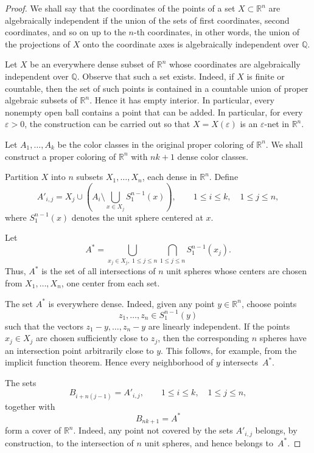 \documentclass[12pt,a4paper]{article}
\begin{document}
\begin{proof}
We shall say that the coordinates of the points of a set
$X\subset\mathbb{R}^n$ are algebraically independent if the union of the
sets of first coordinates, second coordinates, and so on up to the
$n$-th coordinates, in other words, the union of the projections of $X$ onto
the coordinate axes is algebraically independent over $\mathbb{Q}$.

Let $X$ be an everywhere dense subset of $\mathbb{R}^n$ whose coordinates
are algebraically independent over $\mathbb{Q}$. Observe that such a set exists. Indeed, if $X$ is finite
or countable, then the set of such points is contained in a countable union
of proper algebraic subsets of \(\mathbb R^n\). Hence it has empty
interior. In particular, every nonempty open ball contains a point that
can be added.  In particular, for every $\varepsilon>0$,
the construction can be carried out so that $X=X(\varepsilon)$ is an
$\varepsilon$-net in $\mathbb{R}^n$.

Let $A_1,\dots,A_k$ be the color classes in the original proper coloring
of $\mathbb{R}^n$. We shall construct a proper coloring of $\mathbb{R}^n$
with $nk+1$ dense color classes.

Partition $X$ into $n$ subsets
$X_1,\dots,X_n$, each dense in $\mathbb{R}^n$. Define
\[
    A'_{i,j}
    =
    X_j\cup
    \left(
        A_i\setminus
        \bigcup_{x\in X_j}S^{n-1}_1(x)
    \right),
    \qquad
    1\leq i\leq k,\quad 1\leq j\leq n,
\]
where $S^{n-1}_1(x)$ denotes the unit sphere centered at $x$.

Let
\[
    A^*
    =
    \bigcup_{x_j\in X_j,\;1\leq j\leq n}
    \bigcap_{1\leq j\leq n} S^{n-1}_1(x_j).
\]
Thus, $A^*$ is the set of all intersections of $n$ unit spheres whose
centers are chosen from $X_1,\dots,X_n$, one center from each set.

The set $A^*$ is everywhere dense. Indeed, given any point
$y\in\mathbb{R}^n$, choose points
\[
z_1,\dots,z_n\in S^{n-1}_1(y)
\]
such that the vectors $z_1-y,\dots,z_n-y$ are linearly independent.
If the points $x_j\in X_j$ are chosen sufficiently close to $z_j$, then
the corresponding $n$ spheres have an intersection point arbitrarily
close to $y$. This follows, for example, from the implicit function
theorem. Hence every neighborhood of $y$ intersects~$A^*$.

The sets
\[
    B_{i+n(j-1)}=A'_{i,j},
    \qquad 1\leq i\leq k,\quad 1\leq j\leq n,
\]
together with
\[
    B_{nk+1}=A^*
\]
form a cover of $\mathbb{R}^n$. Indeed, any point not covered by the sets
$A'_{i,j}$ belongs, by construction, to the intersection of $n$ unit
spheres, and hence belongs to~$A^*$.


\end{proof}
\end{document}

